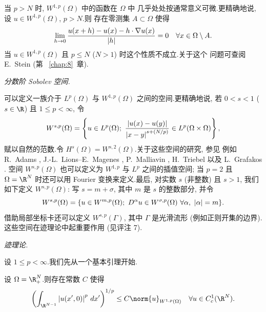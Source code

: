  当 $p>N$ 时, $W^{1,p}(\Omega)$ 中的函数在 $\Omega$ 中
几乎处处按通常意义可微.更精确地说, 设 $u\in W^{1,p}(\Omega)$, $p>N$.则
存在零测集 $A\subset\Omega$ 使得
\begin{equation*}
\lim_{h\to0}\frac{u(x+h)-u(x)-h\cdot\nabla u(x)}{\left|h\right|}=0
\quad\forall x\in\Omega\setminus A.
\end{equation*}
当 $u\in W^{1,p}(\Omega)$ 且 $p\le N$ ($N>1$) 时这个性质不成立.关于这个
问题可查阅 E.~Stein  (第~
\ref{chap:8}~章).

 \emph{分数阶 Sobolev 空间.}

可以定义一族介于 $L^p(\Omega)$ 与 $W^{1,p}(\Omega)$ 之间的空间.更精确地说,
若 $0<s<1$ ($s\in\R$) 且 $1\le p<\infty$, 令
\begin{equation*}
W^{s,p}(\Omega)=\left\{u\in L^p(\Omega);\
\frac{\left|u(x)-u(y)\right|}{\left|x-y\right|^{s+(N/p)}}\in L^p(\Omega\times\Omega)
\right\},
\end{equation*}
赋以自然的范数.令 $H^s(\Omega)=W^{s,2}(\Omega)$.关于这些空间的研究, 参见
例如 R.~Adams , J.-L.~Lions--E.~Magenes
, P.~Malliavin ,
H.~Triebel  以及 L.~Grafakos .
空间 $W^{s,p}(\Omega)$ 也可以定义为 $W^{1,p}$ 与 $L^p$ 之间的插值空间;
当 $p=2$ 且 $\Omega=\R^N$ 时还可以用 Fourier 变换来定义.最后, 对实数
$s$ (非整数) 且 $s>1$, 我们如下定义 $W^{s,p}(\Omega)$: 写
$s=m+\sigma$, 其中 $m$ 是 $s$ 的整数部分, 并令
\begin{equation*}
W^{s,p}(\Omega)=\{u\in W^{m,p}(\Omega);\
D^\alpha u\in W^{\sigma,p}(\Omega)\ \forall\alpha,\ \abs{\alpha}=m\}.
\end{equation*}
借助局部坐标卡还可以定义 $W^{s,p}(\Gamma)$, 其中 $\Gamma$ 是光滑流形
(例如正则开集的边界).这些空间在迹理论中起重要作用 (见评注 7).

 \emph{迹理论.}

设 $1\le p<\infty$.我们先从一个基本引理开始.

\begin{lemma}
\label{lem:9.9}
设 $\Omega=\R^N_+$.则存在常数 $C$ 使得
\begin{equation*}
\left(\int_{\R^{N-1}}\abs{u(x',0)}^p\,dx'\right)^{1/p}
\le C\norm{u}_{W^{1,p}(\Omega)}\quad\forall u\in C_c^1(\R^N).
\end{equation*}
\end{lemma}

